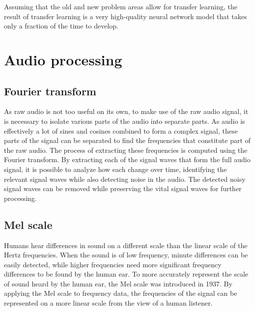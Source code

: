 Assuming that the old and new problem areas allow for transfer learning, the result of transfer learning is a very high-quality neural network model that takes only a fraction of the time to develop.

\section{Audio processing}


\subsection{Fourier transform}
As raw audio is not too useful on its own, to make use of the raw audio signal, it is necessary to isolate various parts of the audio into separate parts.
As audio is effectively a lot of sines and cosines combined to form a complex signal, these parts of the signal can be separated to find the frequencies that constitute part of the raw audio.
The process of extracting these frequencies is computed using the Fourier transform.
By extracting each of the signal waves that form the full audio signal, it is possible to analyze how each change over time, identifying the relevant signal waves while also detecting noise in the audio.
The detected noisy signal waves can be removed while preserving the vital signal waves for further processing.


\subsection{Mel scale}
Humans hear differences in sound on a different scale than the linear scale of the Hertz frequencies.
When the sound is of low frequency, minute differences can be easily detected, while higher frequencies need more significant frequency differences to be found by the human ear.
To more accurately represent the scale of sound heard by the human ear, the Mel scale was introduced in 1937\cite{melpaper}.
By applying the Mel scale to frequency data, the frequencies of the signal can be represented on a more linear scale from the view of a human listener.

